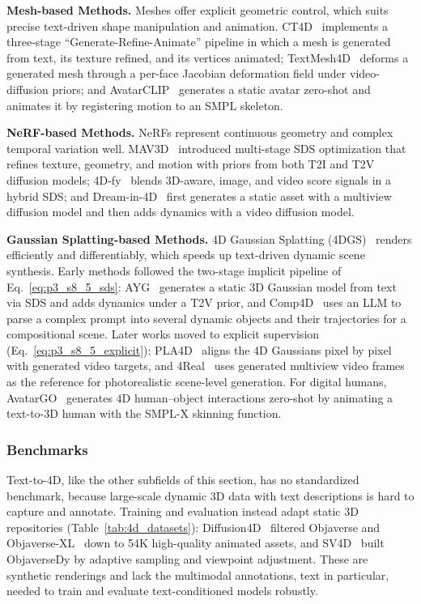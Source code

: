 \textbf{Mesh-based Methods.} Meshes offer explicit geometric control, which suits precise text-driven shape manipulation and animation.
CT4D~\cite{chen2024ct4d} implements a three-stage ``Generate-Refine-Animate'' pipeline in which a mesh is generated from text, its texture refined, and its vertices animated; TextMesh4D~\cite{dai2025textmesh4d} deforms a generated mesh through a per-face Jacobian deformation field under video-diffusion priors; and AvatarCLIP~\cite{HongZPCYL22} generates a static avatar zero-shot and animates it by registering motion to an SMPL skeleton.

\textbf{NeRF-based Methods.} NeRFs represent continuous geometry and complex temporal variation well.
MAV3D~\cite{singer2023text} introduced multi-stage SDS optimization that refines texture, geometry, and motion with priors from both T2I and T2V diffusion models; 4D-fy~\cite{bahmani20244d} blends 3D-aware, image, and video score signals in a hybrid SDS; and Dream-in-4D~\cite{zheng2024unified} first generates a static asset with a multiview diffusion model and then adds dynamics with a video diffusion model.

\textbf{Gaussian Splatting-based Methods.} 4D Gaussian Splatting (4DGS)~\cite{zhao2024hfgs,wu20244d} renders efficiently and differentiably, which speeds up text-driven dynamic scene synthesis. Early methods followed the two-stage implicit pipeline of Eq.~\eqref{eq:p3_s8_5_sds}: AYG~\cite{ling2024align} generates a static 3D Gaussian model from text via SDS and adds dynamics under a T2V prior, and Comp4D~\cite{xu2024comp4d} uses an LLM to parse a complex prompt into several dynamic objects and their trajectories for a compositional scene.
Later works moved to explicit supervision (Eq.~\eqref{eq:p3_s8_5_explicit}): PLA4D~\cite{miao2024pla4d} aligns the 4D Gaussians pixel by pixel with generated video targets, and 4Real~\cite{yu20244real} uses generated multiview video frames as the reference for photorealistic scene-level generation.
For digital humans, AvatarGO~\cite{cao2024avatargo} generates 4D human--object interactions zero-shot by animating a text-to-3D human with the SMPL-X skinning function.


\subsubsection{Benchmarks}
\label{subsubsec:p3_s8_5_1_benchmarks}
Text-to-4D, like the other subfields of this section, has no standardized benchmark, because large-scale dynamic 3D data with text descriptions is hard to capture and annotate. Training and evaluation instead adapt static 3D repositories (Table~\ref{tab:4d_datasets}): Diffusion4D~\cite{liang2024diffusion4d} filtered Objaverse and Objaverse-XL~\cite{deitke2023objaverse,deitke2023objaversexl} down to 54K high-quality animated assets, and SV4D~\cite{xie2024sv4d} built ObjaverseDy by adaptive sampling and viewpoint adjustment. These are synthetic renderings and lack the multimodal annotations, text in particular, needed to train and evaluate text-conditioned models robustly.

